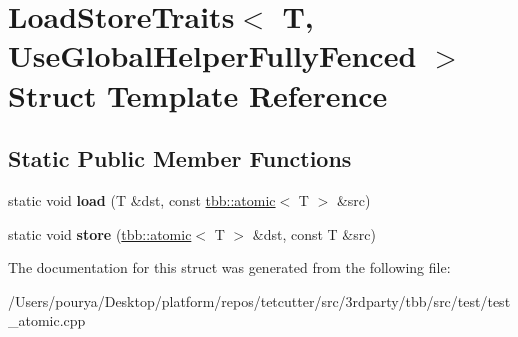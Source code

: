 \hypertarget{structLoadStoreTraits_3_01T_00_01UseGlobalHelperFullyFenced_01_4}{}\section{Load\+Store\+Traits$<$ T, Use\+Global\+Helper\+Fully\+Fenced $>$ Struct Template Reference}
\label{structLoadStoreTraits_3_01T_00_01UseGlobalHelperFullyFenced_01_4}
\subsection*{Static Public Member Functions}
\begin{DoxyCompactItemize}
\item 
\hypertarget{structLoadStoreTraits_3_01T_00_01UseGlobalHelperFullyFenced_01_4_a5d7d7c644e9c173b721f64676394a188}{}static void {\bfseries load} (T \&dst, const \hyperlink{structtbb_1_1atomic}{tbb\+::atomic}$<$ T $>$ \&src)\label{structLoadStoreTraits_3_01T_00_01UseGlobalHelperFullyFenced_01_4_a5d7d7c644e9c173b721f64676394a188}

\item 
\hypertarget{structLoadStoreTraits_3_01T_00_01UseGlobalHelperFullyFenced_01_4_a773545abe22054e746861b0aec23a0c3}{}static void {\bfseries store} (\hyperlink{structtbb_1_1atomic}{tbb\+::atomic}$<$ T $>$ \&dst, const T \&src)\label{structLoadStoreTraits_3_01T_00_01UseGlobalHelperFullyFenced_01_4_a773545abe22054e746861b0aec23a0c3}

\end{DoxyCompactItemize}


The documentation for this struct was generated from the following file\+:\begin{DoxyCompactItemize}
\item 
/\+Users/pourya/\+Desktop/platform/repos/tetcutter/src/3rdparty/tbb/src/test/test\+\_\+atomic.\+cpp\end{DoxyCompactItemize}
